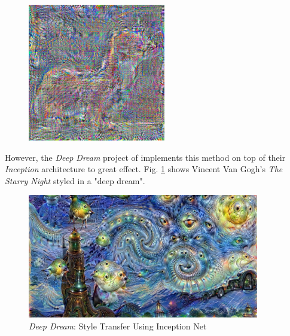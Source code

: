 \documentclass{article}
\begin{document}
\begin{figure}[htp]
\begin{minipage}{0.3\linewidth}
    \end{minipage}
    \begin{minipage}{0.3\linewidth}
    \includegraphics[width=\textwidth]{img/other-models/alex-net-x}
    \end{minipage}
\end{figure}

However, the \textit{Deep Dream} project of \cite{deep-dream} implements this
method on top of their \textit{Inception} architecture to great effect. Fig.
\ref{fig:deep-dream} shows Vincent Van Gogh's \textit{The Starry Night}
styled in a "deep dream".

\begin{figure}[htp]
\centering
\caption{\textit{Deep Dream}: Style Transfer Using Inception Net}
\label{fig:deep-dream}
\includegraphics[width=0.9\textwidth]{img/deep-dream}
\end{figure}
\end{document}
